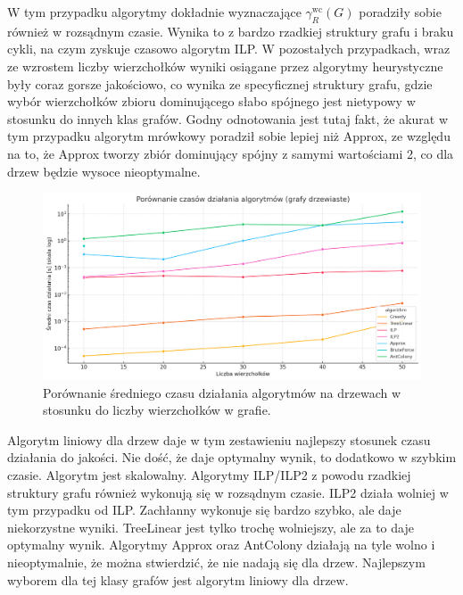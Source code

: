     W tym przypadku algorytmy dokładnie wyznaczające $\gamma^{\text{wc}}_R(G)$ poradziły sobie również w rozsądnym czasie. Wynika to z bardzo rzadkiej struktury grafu i braku cykli, na czym zyskuje czasowo algorytm ILP. W pozostałych przypadkach, wraz ze wzrostem liczby wierzchołków wyniki osiągane przez algorytmy heurystyczne były coraz gorsze jakościowo, co wynika ze specyficznej struktury grafu, gdzie wybór wierzchołków zbioru dominującego słabo spójnego jest nietypowy w stosunku do innych klas grafów. Godny odnotowania jest tutaj fakt, że akurat w tym przypadku algorytm mrówkowy poradził sobie lepiej niż Approx, ze względu na to, że Approx tworzy zbiór dominujący spójny z samymi wartościami 2, co dla drzew będzie wysoce nieoptymalne.

    \begin{figure}[H]
        \centering
        \includegraphics[width=\textwidth]{assets/trees.png}
        \caption{Porównanie średniego czasu działania algorytmów na drzewach w stosunku do liczby wierzchołków w grafie.}
        \label{fig:treePlot}
    \end{figure}

    Algorytm liniowy dla drzew daje w tym zestawieniu najlepszy stosunek czasu działania do jakości. Nie dość, że daje optymalny wynik, to dodatkowo w szybkim czasie. Algorytm jest skalowalny. Algorytmy ILP/ILP2 z powodu rzadkiej struktury grafu również wykonują się w rozsądnym czasie. ILP2 działa wolniej w tym przypadku od ILP. Zachłanny wykonuje się bardzo szybko, ale daje niekorzystne wyniki. TreeLinear jest tylko trochę wolniejszy, ale za to daje optymalny wynik. Algorytmy Approx oraz AntColony działają na tyle wolno i nieoptymalnie, że można stwierdzić, że nie nadają się dla drzew. Najlepszym wyborem dla tej klasy grafów jest algorytm liniowy dla drzew.

